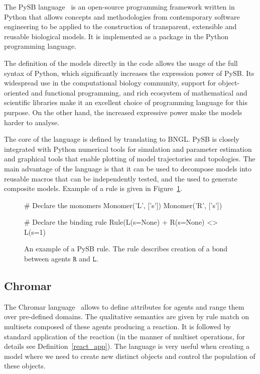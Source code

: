 \documentclass[11pt,a4paper]{report}
\begin{document}
The PySB language~\cite{lopez2013programming} is an open-source programming framework written in Python that allows concepts and methodologies from contemporary software engineering to be applied to the construction of transparent, extensible and reusable biological models. It is implemented as a package in the Python programming language. 

The definition of the models directly in the code allows the usage of the full syntax of Python, which significantly increases the expression power of PySB. Its widespread use in the computational biology community, support for object-oriented and functional programming, and rich ecosystem of mathematical and scientific libraries make it an excellent choice of programming language for this purpose. On the other hand, the increased expressive power make the models harder to analyse.

The core of the language is defined by translating to BNGL. PySB is closely integrated with Python numerical tools for simulation and parameter estimation and graphical tools that enable plotting of model trajectories and topologies. The main advantage of the language is that it can be used to decompose models into reusable macros that can be independently tested, and the used to generate composite models. Example of a rule is given in Figure~\ref{pysb_rule}.

\begin{figure}[!h]
\begin{center}
\begin{python}
# Declare the monomers
Monomer('L', ['s'])
Monomer('R', ['s'])

# Declare the binding rule
Rule(L(s=None) +  R(s=None) <> L(s=1) %
\end{python}
\end{center}
\caption{An example of a PySB rule. The rule describes creation of a bond between agents $\mathtt{R}$ and $\mathtt{L}$.}\label{PySB-rule}\label{pysb_rule}
\end{figure}

\subsection{Chromar}

The Chromar language~\cite{honorato2018chromar} allows to define attributes for agents and range them over pre-defined domains. The qualitative semantics are given by rule match on multisets composed of these agents producing a reaction. It is followed by standard application of the reaction (in the manner of multiset operations, for details see Definition~\ref{react_app}). The language is very useful when creating a model where we need to create new distinct objects and control the population of these objects.
\end{document}
